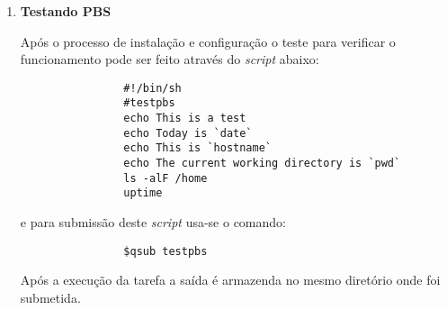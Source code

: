 \begin{enumerate}
		\item \textbf{Testando PBS}
		
			Após o processo de instalação e configuração o teste para verificar o funcionamento pode ser feito através do \emph{script} abaixo:
			\begin{scriptsize}
			\begin{verbatim}
				#!/bin/sh
				#testpbs
				echo This is a test
				echo Today is `date`
				echo This is `hostname`
				echo The current working directory is `pwd`
				ls -alF /home
				uptime
			\end{verbatim}
			\end{scriptsize}
			e para submissão deste \emph{script} usa-se o comando:
			\begin{scriptsize}
			\begin{verbatim}
				$qsub testpbs
			\end{verbatim}
			\end{scriptsize}
			Após a execução da tarefa a saída é armazenda no mesmo diretório onde foi submetida.
\end{enumerate}